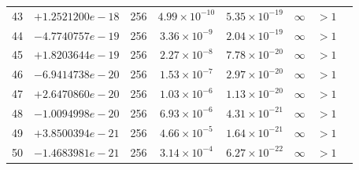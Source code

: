 \documentclass[11pt]{article}
\begin{document}
\begin{longtable}{rlcccccc}
43 & $+1.2521200e-18$ & 256 & $4.99 \times 10^{-10}$ & $5.35 \times 10^{-19}$ & $\infty$ & $> 1$ \\
44 & $-4.7740757e-19$ & 256 & $3.36 \times 10^{-9}$ & $2.04 \times 10^{-19}$ & $\infty$ & $> 1$ \\
45 & $+1.8203644e-19$ & 256 & $2.27 \times 10^{-8}$ & $7.78 \times 10^{-20}$ & $\infty$ & $> 1$ \\
46 & $-6.9414738e-20$ & 256 & $1.53 \times 10^{-7}$ & $2.97 \times 10^{-20}$ & $\infty$ & $> 1$ \\
47 & $+2.6470860e-20$ & 256 & $1.03 \times 10^{-6}$ & $1.13 \times 10^{-20}$ & $\infty$ & $> 1$ \\
48 & $-1.0094998e-20$ & 256 & $6.93 \times 10^{-6}$ & $4.31 \times 10^{-21}$ & $\infty$ & $> 1$ \\
49 & $+3.8500394e-21$ & 256 & $4.66 \times 10^{-5}$ & $1.64 \times 10^{-21}$ & $\infty$ & $> 1$ \\
50 & $-1.4683981e-21$ & 256 & $3.14 \times 10^{-4}$ & $6.27 \times 10^{-22}$ & $\infty$ & $> 1$ \\
\bottomrule
\end{longtable}
\end{document}
